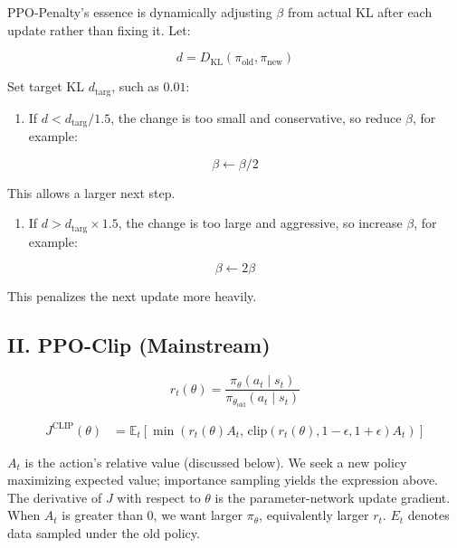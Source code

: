 PPO-Penalty's essence is dynamically adjusting \(\beta\) from actual KL after each update rather than fixing it. Let:

\[
d = D_{\mathrm{KL}}(\pi_{\mathrm{old}},\pi_{\mathrm{new}})
\]

Set target KL \(d_{\mathrm{targ}}\), such as \(0.01\):

\begin{enumerate}
\def\labelenumi{\arabic{enumi}.}
\tightlist
\item
{}
  If \(d < d_{\mathrm{targ}}/1.5\), the change is too small and conservative, so reduce \(\beta\), for example:
\end{enumerate}

\[
\beta \leftarrow \beta/2
\]

This allows a larger next step.

\begin{enumerate}
\def\labelenumi{\arabic{enumi}.}
\setcounter{enumi}{1}
\tightlist
\item
{}
  If \(d > d_{\mathrm{targ}}\times 1.5\), the change is too large and aggressive, so increase \(\beta\), for example:
\end{enumerate}

\[
\beta \leftarrow 2\beta
\]

This penalizes the next update more heavily.

\hypertarget{ii.-ppo-clip-mainstream}{%
\subsection{II. PPO-Clip (Mainstream)}\label{ii.-ppo-clip-mainstream}}

\[
r_t(\theta)=\frac{\pi_\theta(a_t\mid s_t)}{\pi_{\theta_{\mathrm{old}}}(a_t\mid s_t)}
\]

\[
\begin{aligned}
J^{\mathrm{CLIP}}(\theta)
&=
\mathbb{E}_t\left[
\min\left(
r_t(\theta)A_t,\,
\mathrm{clip}(r_t(\theta),1-\epsilon,1+\epsilon)A_t
\right)
\right]
\end{aligned}
\]

\(A_t\) is the action's relative value (discussed below). We seek a new policy maximizing expected value; importance sampling yields the expression above. The derivative of \(J\) with respect to \(\theta\) is the parameter-network update gradient. When \(A_t\) is greater than \(0\), we want larger \(\pi_\theta\), equivalently larger \(r_t\). \(E_t\) denotes data sampled under the old policy.

